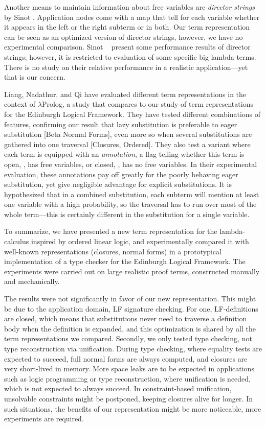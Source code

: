\documentclass[submission,copyright,creativecommons]{eptcs}
\begin{document}
Another means to maintain information about free variables are
\emph{director strings} by Sinot \cite{sinot:jlc05}.  Application
nodes come with a map that tell for each variable whether it appears
in the left or the right subterm or in both.  Our term representation
can be seen as an optimized version of director strings, however, we
have no experimental comparison. 
Sinot \etal~\cite{fernandezMackieSinot:aaecc05} present some
performance results of director strings; however, it is restricted
to evaluation of some specific big lambda-terms.  There is no study on
their relative performance in a realistic application---yet that is
our concern.

Liang, Nadathur, and Qi \cite{liangNadathurQi:jar05} have evaluated
different term representations in the context of $\lambda$Prolog, a
study that compares to our study of term representations for the
Edinburgh Logical Framework.  They have tested different combinations
of features, confirming our result that lazy substitution is 
preferable to eager substitution {[Beta Normal Forms]},
even more so when several substitutions are gathered into one
traversal {[Closures, Ordered]}.  They also test a variant where
each term is equipped with an \emph{annotation}, a flag telling whether
this term is open, \ie, has free variables, or closed, \ie, has no
free variables.  In their experimental evaluation, these annotations
pay off greatly for the poorly behaving eager substitution, yet give
negligible advantage for explicit substitutions.  It is
hypothesized that in a combined substitution, each subterm will
mention at least one variable with a high probability, so the
traversal has to run over most of the whole term---this is certainly
different in the substitution for a single variable.

To summarize, we have presented a new term representation for the
lambda-calculus inspired by ordered linear logic, and experimentally
compared it with well-known representations (closures, normal forms)
in a prototypical implementation of a type checker for the Edinburgh
Logical Framework.  The experiments were carried out on large realistic
proof terms, constructed manually and mechanically.  

The results were not significantly in favor of our new representation.
This might be due to the application domain, LF signature checking.
For one, LF-definitions are closed, which means that substitutions
never need to traverse a definition body when the definition is
expanded, and this optimization is shared by all the term
representations we compared.  Secondly, we only tested type checking,
not type reconstruction via unification.  During type checking, where
equality tests are expected to succeed, full normal forms are always
computed, and closures are very short-lived in memory.  More space
leaks are to be expected in applications such as logic programming or
type reconstruction, where unification is needed, which is not
expected to always succeed.   In constraint-based unification,
unsolvable constraints might be postponed, keeping closures alive for
longer.  In such situations, the benefits of our representation might
be more noticeable, more experiments are required.
\end{document}
